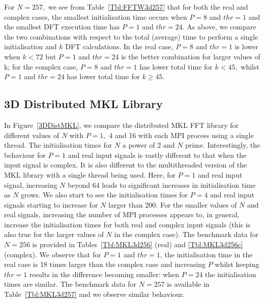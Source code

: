 \documentclass[a4paper]{article}
\begin{document}
For $N=257,$ we see from Table~\ref{Tbl:FFTW3d257} that for both the
real and complex cases, the smallest initialisation time occurs when
$P=8$ and $thr=1$ and the smallest DFT execution time has $P=1$ and
$thr=24.$ As above, we compare the two combinations with respect to
the total (average) time to perform a single initialisation and $k$
DFT calculations. In the real case, $P=8$ and $thr=1$ is lower when
$k<72$ but $P=1$ and $thr=24$ is the better combination for larger
values of k; for the complex case, $P=8$ and $thr=1$ has lower total
time for $k<45,$ whilst $P=1$ and $thr=24$ has lower total time for
$k\ge 45.$



\subsection{3D Distributed MKL Library}\label{Sec:3DDistMKL}
In Figure~\ref{3DDistMKL}, we compare the distributed MKL FFT library
for different values of $N$ with $P=1,$ 4 and 16 with each MPI process
using a single thread. The initialisation times for $N$ a power of 2
and $N$ prime. Interestingly, the behaviour for $P=1$ and real input
signals is vastly different to that when the input signal is
complex. It is also different to the multithreaded version of the MKL
library with a single thread being used. Here, for $P=1$ and real
input signal, increasing $N$ beyond 64 leads to significant increases
in initialisation time as $N$ grows. We also start to see the
initialisation times for $P=4$ and real input signals starting to
increase for $N$ larger than 200. For the smaller values of $N$ and
real signals, increasing the number of MPI processes appears to, in
general, increase the initialisation times for both real and complex
input signals (this is also true for the larger values of $N$ in the
complex case). The benchmark data for $N=256$ is provided in
Tables~\ref{Tbl:MKL3d256} (real) and \ref{Tbl:MKL3d256c} (complex). We
observe that for $P=1$ and $thr=1$, the initialisation time in the
real case is 18 times larger than the complex case and increasing $P$
whilst keeping $thr=1$ results in the difference becoming smaller:
when $P=24$ the initialisation times are similar. The benchmark data
for $N=257$ is available in Table~\ref{Tbl:MKL3d257} and we observe
similar behaviour.
\end{document}
